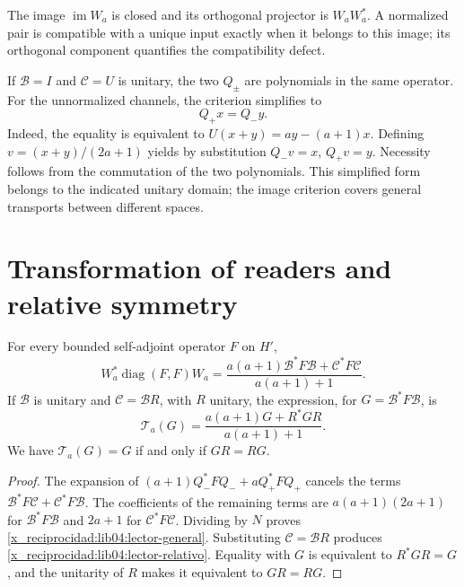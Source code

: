 The image \(\operatorname{im}W_a\) is closed and its orthogonal
projector is \(W_aW_a^*\). A normalized pair is compatible with a
unique input exactly when it belongs to this image; its orthogonal
component quantifies the compatibility defect.

If \(\mathcal B=I\) and \(\mathcal C=U\) is unitary, the two
\(Q_\pm\) are polynomials in the same operator. For the unnormalized
channels, the criterion simplifies to
\begin{equation}
 Q_+x=Q_-y.
 \label{x_reciprocidad:lib04:compatibilidad-unitaria}
\end{equation}
Indeed, the equality is equivalent to
\(U(x+y)=ay-(a+1)x\). Defining
\(v=(x+y)/(2a+1)\) yields by substitution
\(Q_-v=x\), \(Q_+v=y\). Necessity follows from the commutation
of the two polynomials. This simplified form belongs to the indicated unitary
domain; the image criterion covers general transports
between different spaces.

\section{Transformation of readers and relative symmetry}
\label{x_reciprocidad:lib04:lectores}

\begin{theorem}
\label{x_reciprocidad:lib04:teo-lector}
For every bounded self-adjoint operator \(F\) on \(H'\),
\begin{equation}
 W_a^*\operatorname{diag}(F,F)W_a
 =\frac{a(a+1)\mathcal B^*F\mathcal B+
                  \mathcal C^*F\mathcal C}{a(a+1)+1}.
 \label{x_reciprocidad:lib04:lector-general}
\end{equation}
If \(\mathcal B\) is unitary and \(\mathcal C=\mathcal BR\), with
\(R\) unitary, the expression, for \(G=\mathcal B^*F\mathcal B\),
is
\begin{equation}
 \mathcal T_a(G)=\frac{a(a+1)G+R^*GR}{a(a+1)+1}.
 \label{x_reciprocidad:lib04:lector-relativo}
\end{equation}
We have \(\mathcal T_a(G)=G\) if and only if \(GR=RG\).
\end{theorem}

\begin{proof}
The expansion of \((a+1)Q_-^*FQ_-+aQ_+^*FQ_+\) cancels the
terms \(\mathcal B^*F\mathcal C+\mathcal C^*F\mathcal B\).
The coefficients of the remaining terms are
\(a(a+1)(2a+1)\) for \(\mathcal B^*F\mathcal B\) and \(2a+1\)
for \(\mathcal C^*F\mathcal C\). Dividing by \(N\) proves
\eqref{x_reciprocidad:lib04:lector-general}. Substituting \(\mathcal C=\mathcal BR\)
produces \eqref{x_reciprocidad:lib04:lector-relativo}. Equality with \(G\) is equivalent
to \(R^*GR=G\), and the unitarity of \(R\) makes it equivalent to
\(GR=RG\).
\end{proof}

